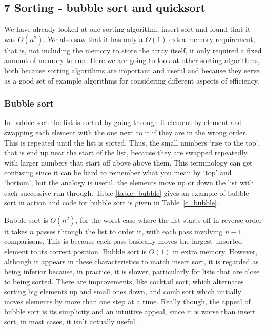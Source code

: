 \documentclass[11pt,a4paper]{scrartcl}
\begin{document}
\subsection*{7 Sorting - bubble sort and quicksort}

We have already looked at one sorting algorithm, insert sort and found
that it was $O(n^2)$. We also saw that it has only a $O(1)$ extra memory
requirement, that is, not including the memory to store the array
itself, it only required a fixed amount of memory to run. Here we are
going to look at other sorting algorithms, both because sorting
algorithms are important and useful and because they serve as a good
set of example algorithms for considering different aspects of
efficiency.

\subsubsection*{Bubble sort}

In bubble sort the list is sorted by going through it element by
element and swapping each element with the one next to it if they are
in the wrong order. This is repeated until the list is sorted. Thus,
the small numbers \lq{}rise to the top\rq{}, that is end up near the
start of the list, because they are swapped repeatedly with larger
numbers that start off above above them. This terminology can get
confusing since it can be hard to remember what you mean by
\lq{}top\rq{} and \lq{}bottom\rq{}, but the analogy is useful, the
elements move up or down the list with each successive run
through. Table \ref{table_bubble} gives an example of bubble sort in
action and code for bubble sort is given in Table~\ref{c_bubble}.

Bubble sort is $O(n^2)$, for the worst case where the list starts off
in reverse order it takes $n$ passes through the list to order it,
with each pass involving $n-1$ comparisons. This is because each pass
basically moves the largest unsorted element to its correct
position. Bubble sort is $O(1)$ in extra memory. However, although it
appears in these characteristics to match insert sort, it is regarded
as being inferior because, in practice, it is slower, particularly for
lists that are close to being sorted. There are improvements, like
cocktail sort, which alternates sorting big elements up and small ones
down, and comb sort which initially moves elements by more than one
step at a time. Really though, the appeal of bubble sort is its
simplicity and an intuitive appeal, since it is worse than insert
sort, in most cases, it isn't actually useful.
\end{document}
